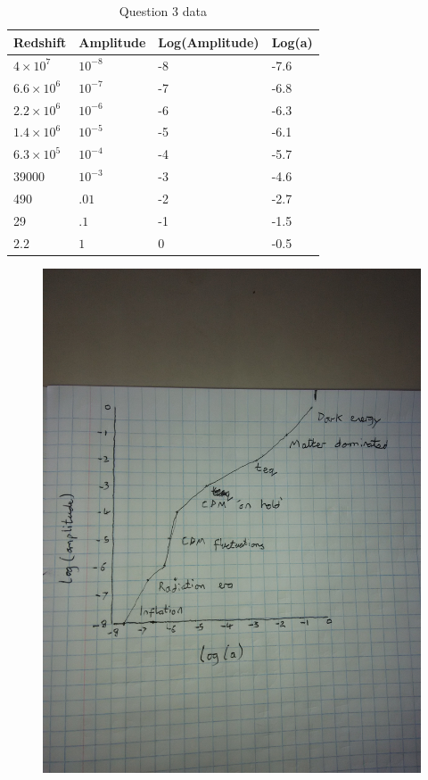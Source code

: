 \documentclass[a4paper,12pt]{article}
\begin{document}
\subsection{}
\begin{table}[ht]
\centering
\begin{tabular}{|l|l|l|l|}
\hline
Redshift & Amplitude & Log(Amplitude) & Log(a) \\
\hline
$4\times10^{7}$ & $10^{-8}$ & -8 & -7.6 \\
$6.6\times10^{6}$ & $10^{-7}$ & -7 & -6.8 \\
$2.2\times10^{6}$ & $10^{-6}$ & -6 & -6.3 \\
$1.4\times10^{6}$ & $10^{-5}$ & -5 & -6.1 \\
$6.3\times10^{5}$ & $10^{-4}$ & -4 & -5.7 \\
39000 & $10^{-3}$ & -3 & -4.6 \\
490 & $.01$ & -2 & -2.7 \\
29 & $.1$ & -1 & -1.5 \\
$2.2$ & $1$ & 0 & -0.5 \\
\hline
\end{tabular}
\caption{\label{tab:task6}Question 3 data}
\end{table}
\begin{figure}[H]
\centering
\includegraphics[width=.9\textwidth]{./tutorial9.jpg}
\caption{}
\label{fig:1}
\end{figure}
\end{document}
